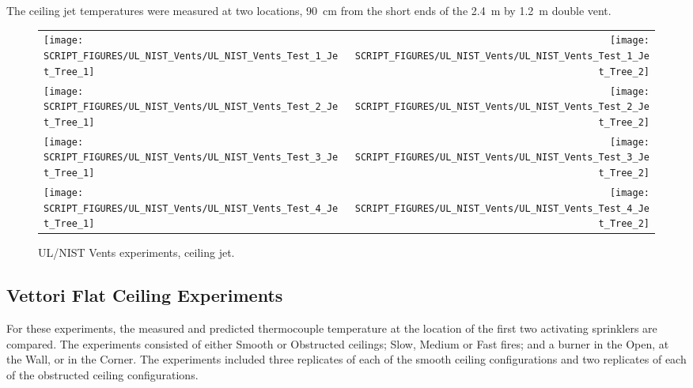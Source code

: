 The ceiling jet temperatures were measured at two locations, 90~cm from the short ends of the 2.4~m by 1.2~m double vent.

\newpage

\begin{figure}[p]
\begin{tabular*}{\textwidth}{l@{\extracolsep{\fill}}r}
\texttt{[image: SCRIPT\_FIGURES/UL\_NIST\_Vents/UL\_NIST\_Vents\_Test\_1\_Jet\_Tree\_1]} &
\texttt{[image: SCRIPT\_FIGURES/UL\_NIST\_Vents/UL\_NIST\_Vents\_Test\_1\_Jet\_Tree\_2]} \\
\texttt{[image: SCRIPT\_FIGURES/UL\_NIST\_Vents/UL\_NIST\_Vents\_Test\_2\_Jet\_Tree\_1]} &
\texttt{[image: SCRIPT\_FIGURES/UL\_NIST\_Vents/UL\_NIST\_Vents\_Test\_2\_Jet\_Tree\_2]} \\
\texttt{[image: SCRIPT\_FIGURES/UL\_NIST\_Vents/UL\_NIST\_Vents\_Test\_3\_Jet\_Tree\_1]} &
\texttt{[image: SCRIPT\_FIGURES/UL\_NIST\_Vents/UL\_NIST\_Vents\_Test\_3\_Jet\_Tree\_2]} \\
\texttt{[image: SCRIPT\_FIGURES/UL\_NIST\_Vents/UL\_NIST\_Vents\_Test\_4\_Jet\_Tree\_1]} &
\texttt{[image: SCRIPT\_FIGURES/UL\_NIST\_Vents/UL\_NIST\_Vents\_Test\_4\_Jet\_Tree\_2]}
\end{tabular*}
\caption{UL/NIST Vents experiments, ceiling jet.}
\label{UL_NIST_Ceiling_Jet}
\end{figure}


\clearpage

\subsection{Vettori Flat Ceiling Experiments}
\label{Vettori_Flat_Results}

For these experiments, the measured and predicted thermocouple temperature at the location of the first two activating sprinklers are compared. The experiments consisted of either Smooth or Obstructed ceilings; Slow, Medium or Fast fires; and a burner in the Open, at the Wall, or in the Corner.
The experiments included three replicates of each of the smooth ceiling configurations and two replicates of each of the obstructed ceiling configurations.

\newpage

